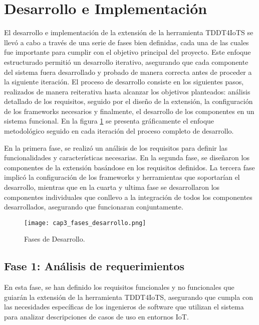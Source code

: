 \section{Desarrollo e Implementación}

El desarrollo e implementación de la extensión de la herramienta TDDT4IoTS se llevó a cabo a través de una serie de fases bien definidas, cada una de las cuales fue importante para cumplir con el objetivo principal del proyecto. Este enfoque estructurado permitió un desarrollo iterativo, asegurando que cada componente del sistema fuera desarrollado y probado de manera correcta antes de proceder a la siguiente iteración. El proceso de desarrollo consiste en los siguientes pasos, realizados de manera reiterativa hasta alcanzar los objetivos planteados: análisis detallado de los requisitos, seguido por el diseño de la extensión, la configuración de los frameworks necesarios y finalmente, el desarrollo de los componentes en un sistema funcional. En la figura \ref{fig:cap3_fases_desarrollo} se presenta gráficamente el enfoque metodológico seguido en cada iteración del proceso completo de desarrollo.

En la primera fase, se realizó un análisis de los requisitos para definir las funcionalidades y características necesarias. En la segunda fase, se diseñaron los componentes de la extensión basándose en los requisitos definidos. La tercera fase implicó la configuración de los frameworks y herramientas que soportarían el desarrollo, mientras que en la cuarta y ultima fase se desarrollaron los componentes individuales que conllevo a la integración de todos los componentes desarrollados, asegurando que funcionaran conjuntamente.

\begin{figure}[H]  
	\centering
	\texttt{[image: cap3\_fases\_desarrollo.png]}
	\caption{Fases de Desarrollo.}
	\label{fig:cap3_fases_desarrollo}
\end{figure}


\subsection{Fase 1: Análisis de requerimientos}

En esta fase, se han definido los requisitos funcionales y no funcionales que guiarán la extensión de la herramienta TDDT4IoTS, asegurando que cumpla con las necesidades específicas de los ingenieros de software que utilizan el sistema para analizar descripciones de casos de uso en entornos IoT.


